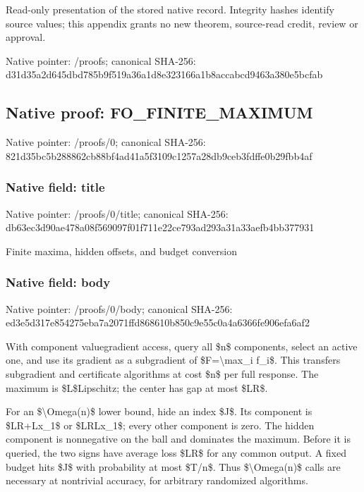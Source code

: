 \documentclass[10pt,a4paper]{article}
\begin{document}
Read-only presentation of the stored native record. Integrity hashes identify source values; this appendix grants no new theorem, source-read credit, review or approval.



Native pointer: /proofs; canonical SHA-256: d31d35a2d645dbd785b9f519\allowbreak{}a36a1d8e323166a1b8accabc\allowbreak{}d9463a380e5bcfab



\subsection{Native proof: FO\_FINITE\_MAXIMUM}


Native pointer: /proofs/0; canonical SHA-256: 821d35bc5b288862cb88bf4a\allowbreak{}d41a5f3109c1257a28db9ceb\allowbreak{}3fdffe0b29fbb4af



\subsubsection{Native field: title}


Native pointer: /proofs/0/title; canonical SHA-256: db63ec3d90ae478a08f56909\allowbreak{}7f01f711e22ce793ad293a31\allowbreak{}a33aefb4bb377931


Finite maxima, hidden offsets, and budget conversion


\subsubsection{Native field: body}


Native pointer: /proofs/0/body; canonical SHA-256: ed3e5d317e854275eba7a207\allowbreak{}1ffd868610b850c9e55c0a4a\allowbreak{}6366fe906efa6af2


With component valuegradient access, query all \$n\$ components, select an active one, and use its gradient as a subgradient of \$F=\textbackslash{}max\_i f\_i\$. This transfers subgradient and certificate algorithms at cost \$n\$ per full response. The maximum is \$L\$Lipschitz; the center has gap at most \$LR\$.

For an \$\textbackslash{}Omega(n)\$ lower bound, hide an index \$J\$. Its component is \$LR+Lx\_1\$ or \$LRLx\_1\$; every other component is zero. The hidden component is nonnegative on the ball and dominates the maximum. Before it is queried, the two signs have average loss \$LR\$ for any common output. A fixed budget hits \$J\$ with probability at most \$T/n\$. Thus \$\textbackslash{}Omega(n)\$ calls are necessary at nontrivial accuracy, for arbitrary randomized algorithms.
\end{document}
